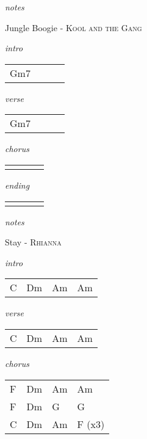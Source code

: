 \documentclass[12pt]{article}
\begin{document}
\textit{notes}

\newpage

{\Huge Jungle Boogie} {\huge - \textsc{Kool and the Gang}}

\huge
\textit{intro}

\begin{tabular}{|P{1.25in}|P{1.25in}|P{1.25in}|P{1.25in}|}
  Gm7 &   &   &   \\
\end{tabular}

\textit{verse}

\begin{tabular}{|P{1.25in}|P{1.25in}|P{1.25in}|P{1.25in}|}
  Gm7 &   &   &   \\
\end{tabular}

\textit{chorus}

\begin{tabular}{|P{1.25in}|P{1.25in}|P{1.25in}|P{1.25in}|}
    &   &   &   \\
\end{tabular}

\textit{ending}

\begin{tabular}{|P{1.25in}|P{1.25in}|P{1.25in}|P{1.25in}|}
    &   &   &   \\
\end{tabular}

\textit{notes}

\newpage

{\Huge Stay} {\huge - \textsc{Rhianna}}

\huge
\textit{intro}

\begin{tabular}{|P{1.25in}|P{1.25in}|P{1.25in}|P{1.25in}|}
  C & Dm  & Am  & Am  \\
\end{tabular}

\textit{verse}

\begin{tabular}{|P{1.25in}|P{1.25in}|P{1.25in}|P{1.25in}|}
  C & Dm  & Am  & Am  \\
\end{tabular}

\textit{chorus}

\begin{tabular}{|P{1.25in}|P{1.25in}|P{1.25in}|P{1.25in}|}
  F & Dm  & Am  & Am  \\
  F & Dm  & G  & G  \\
  C & Dm & Am & F (x3) \\
\end{tabular}
\end{document}
